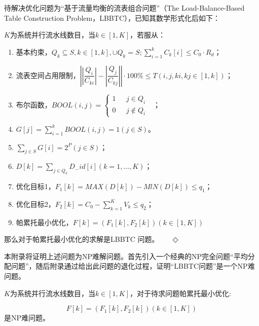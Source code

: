 
 \label{fulua}

待解决优化问题为“基于流量均衡的流表组合问题”（The Load-Balance-Based Table Construction Problem，LBBTC），已知其数学形式化后如下：

\begin{definition}[LBBTC]
	$K$为系统并行流水线数目，当$k\in [1,K]$，若服从：
	\begin{enumerate}
		\item 基本约束，$Q_{k}\subseteq S, k\in \left[ 1,k\right],\cup Q_{k}=S;\sum ^{k}_{i=1}C_{k}\left[ i\right] \leq C_{0}\cdot R_{d} $；
		\item 流表空间占用限制，$\left| \left| \dfrac {Q_{i}}{C_{ki}}\right| -\left| \dfrac {Q_{j}}{C_{kj}}\right| \right|\cdot 100\%\leq T\left( i, j, ki, kj\in \left[ 1,k\right] \right) $；
		\item 布尔函数，$ BOOL\left(i,j\right)=
		\begin{cases}
		1& \text{ $j \in Q_i$ }\\
		0& \text{ $j \notin Q_i$}
		\end{cases}$；
		\item $G\left[ j\right] =\sum ^{k}_{i=1}BOOL\left( i,j\right) =1\left( j\in S\right)  $。
		\item $\sum _{j\in S}G\left[ i\right] =2^{P}\left( j\in S\right)  $；
		\item $D\left[ k\right] =\sum _{j\in Q_{k}}D_{-}id\left[ i\right] \left( k=1,\ldots ,K\right)  $；
		\item 优化目标1，$ F_{1}\left[ k\right] =MAX\left( D\left[ k\right] \right) -MlN\left( D\left[ k\right] \right) \leq q_1$；
		\item 优化目标2，$ F_{2}\left[ k\right] =C_{0}-\sum ^{K}_{k=1}V_{k}\leq q_{2}$；
		\item 帕累托最小优化，$ F\left[ k\right] =\left( F_{1}\left[ k\right] ,F_{2}\left[ k\right] \right) \left( k\in \left[ 1,K\right] \right)  $
	\end{enumerate}
	那么对于帕累托最小优化的求解是{\hei LBBTC} 问题。 \qquad \qquad \qquad \qquad \qquad \qquad \qquad ~~ $\Diamond$
\end{definition}

本附录将证明上述问题为NP难解问题。首先引入一个经典的NP完全问题“平均分配问题”，随后附录通过给出此问题的退化过程，证明“LBBTC问题”是一个NP难问题。



\begin{theorem}%
	$K$为系统并行流水线数目，当$k\in [1,K]$，对于待求问题帕累托最小优化:
	
	\begin{equation} \label{a1}
	F\left[ k\right] =\left( F_{1}\left[ k\right] ,F_{2}\left[ k\right] \right) \left( k\in \left[ 1,K\right] \right)
	\end{equation}
	是NP难问题。
\end{theorem}



